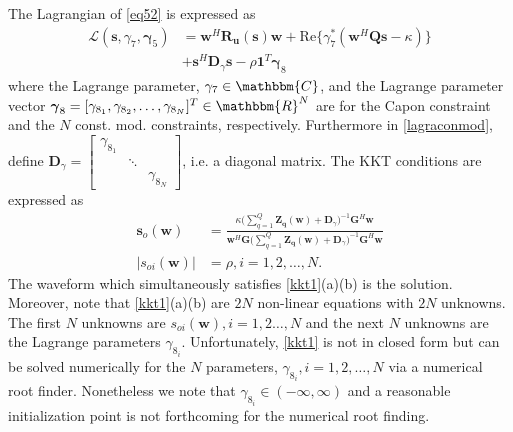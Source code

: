 \documentclass[11pt,draftclsnofoot,onecolumn]{IEEEtran}
\theoremstyle{definition}
\theoremstyle{remark}
\begin{document}
The Lagrangian of \eqref{eq52} is expressed as
\begin{align} \label{lagraconmod}
\mathcal{L}(\mathbf{s}, \gamma_7,\boldsymbol{\gamma}_5)&=\mathbf{w}^H\mathbf{R_u}(\mathbf{s})\mathbf{w} +\mbox{Re}\{ \gamma_7^{\ast} (\mathbf{w}^H\mathbf{Qs}-\kappa)\} \nonumber  \\
&+\mathbf{s}^H\mathbf{D}_{\gamma}\mathbf{s} -\rho\mathbf{1}^T\boldsymbol{\gamma}_8
\end{align}
where the Lagrange parameter, $\gamma_7\in\mathbbm{C}$, and the Lagrange parameter vector $\boldsymbol{\gamma}_8=[\gamma_{8_1},\gamma_{8_2},\ldots,\gamma_{8_N}]^T\in\mathbbm{R}^{N}$ are for the Capon constraint and the $N$ const. mod. constraints, respectively. Furthermore in  \eqref{lagraconmod}, define $\mathbf{D}_{\gamma}= \left[ \begin{smallmatrix} \gamma_{8_1}& & \\
& \ddots & \\ & &\gamma_{8_N} \end{smallmatrix} \right]$, i.e. a diagonal matrix. The KKT conditions are expressed as
\begin{subequations}\label{kkt1}
\begin{align} 
\mathbf{s}_o(\mathbf{w})&=\frac{\kappa \bigl( \sum\limits_{q=1}^Q \mathbf{Z_q}( \mathbf{w})+\mathbf{D}_{\gamma}\bigr)^{-1}\mathbf{G}^H\mathbf{w} }{\mathbf{w}^H\mathbf{G} \bigl( \sum\limits_{q=1}^Q \mathbf{Z_q}( \mathbf{w}) +\mathbf{D}_{\gamma}\bigr)^{-1}\mathbf{G}^H\mathbf{w}} \\
|s_{oi}(\mathbf{w})|&=\rho,i=1,2,\ldots,N.
\end{align}
\end{subequations}
The waveform which simultaneously satisfies \eqref{kkt1}(a)(b) is the solution. Moreover, note that \eqref{kkt1}(a)(b) are $2N$ non-linear equations with $2N$ unknowns. The first $N$ unknowns are $s_{oi}(\mathbf{w}),i=1,2\ldots,N$ and the next $N$ unknowns are the Lagrange parameters $\gamma_{8_i}$. Unfortunately, \eqref{kkt1} is not in closed form but can be solved numerically for the $N$ parameters, $\gamma_{8_i},i=1,2,\ldots,N$ via a numerical root finder. Nonetheless we note that $\gamma_{8_i}\in (-\infty,\infty)$ and a reasonable initialization point is not forthcoming for the numerical root finding. 
\end{document}
